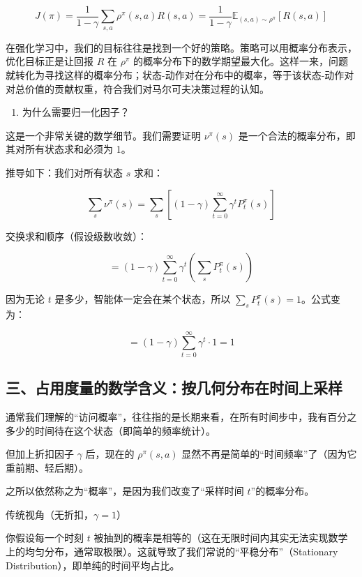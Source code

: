 \[
J(\pi) = \frac{1}{1-\gamma}\sum_{s,a}\rho^\pi(s,a)R(s,a) = \frac{1}{1-\gamma}\mathbb{E}_{(s,a)\sim\rho^\pi}[R(s,a)]
\]

在强化学习中，我们的目标往往是找到一个好的策略。策略可以用概率分布表示，优化目标正是让回报 \(R\) 在 \(\rho^\pi\) 的概率分布下的数学期望最大化。这样一来，问题就转化为寻找这样的概率分布；状态-动作对在分布中的概率，等于该状态-动作对对总价值的贡献权重，符合我们对马尔可夫决策过程的认知。

\begin{enumerate}
\def\labelenumi{\arabic{enumi}.}
\setcounter{enumi}{1}
\tightlist
\item
  为什么需要归一化因子？
\end{enumerate}

这是一个非常关键的数学细节。我们需要证明 \(\nu^\pi(s)\) 是一个合法的概率分布，即其对所有状态求和必须为 1。

推导如下：我们对所有状态 \(s\) 求和：

\[
\sum_s \nu^\pi(s) = \sum_s\left[(1-\gamma)\sum_{t=0}^{\infty}\gamma^t P_t^\pi(s)\right]
\]

交换求和顺序（假设级数收敛）：

\[
= (1-\gamma)\sum_{t=0}^{\infty}\gamma^t\left(\sum_s P_t^\pi(s)\right)
\]

因为无论 \(t\) 是多少，智能体一定会在某个状态，所以 \(\sum_s P_t^\pi(s)=1\)。公式变为：

\[
= (1-\gamma)\sum_{t=0}^{\infty}\gamma^t \cdot 1 = 1
\]

\hypertarget{ux4e09ux5360ux7528ux5ea6ux91cfux7684ux6570ux5b66ux542bux4e49ux6309ux51e0ux4f55ux5206ux5e03ux5728ux65f6ux95f4ux4e0aux91c7ux6837}{%
\subsection{三、占用度量的数学含义：按几何分布在时间上采样}\label{ux4e09ux5360ux7528ux5ea6ux91cfux7684ux6570ux5b66ux542bux4e49ux6309ux51e0ux4f55ux5206ux5e03ux5728ux65f6ux95f4ux4e0aux91c7ux6837}}

通常我们理解的``访问概率''，往往指的是长期来看，在所有时间步中，我有百分之多少的时间待在这个状态（即简单的频率统计）。

但加上折扣因子 \(\gamma\) 后，现在的 \(\rho^\pi(s,a)\) 显然不再是简单的``时间频率''了（因为它重前期、轻后期）。

之所以依然称之为``概率''，是因为我们改变了``采样时间 \(t\)''的概率分布。

传统视角（无折扣，\(\gamma=1\)）

你假设每一个时刻 \(t\) 被抽到的概率是相等的（这在无限时间内其实无法实现数学上的均匀分布，通常取极限）。这就导致了我们常说的``平稳分布''（Stationary Distribution），即单纯的时间平均占比。

